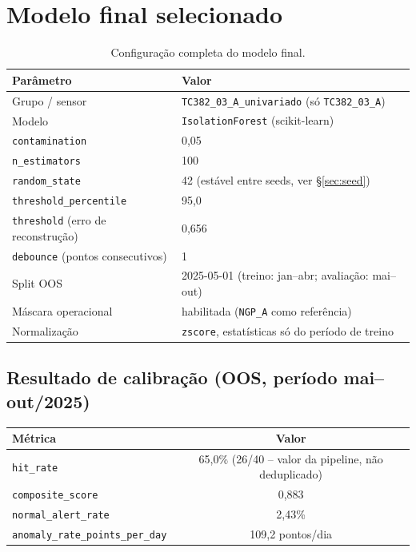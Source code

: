 \documentclass[11pt,a4paper]{article}
\begin{document}
\section{Modelo final selecionado}
\label{sec:modelo}

\begin{table}[H]
\centering
\begin{tabular}{@{}ll@{}}
\toprule
\textbf{Parâmetro} & \textbf{Valor} \\
\midrule
Grupo / sensor & \texttt{TC382\_03\_A\_univariado} (só \texttt{TC382\_03\_A}) \\
Modelo & \texttt{IsolationForest} (scikit-learn) \\
\texttt{contamination} & 0,05 \\
\texttt{n\_estimators} & 100 \\
\texttt{random\_state} & 42 (estável entre seeds, ver \S\ref{sec:seed}) \\
\texttt{threshold\_percentile} & 95,0 \\
\texttt{threshold} (erro de reconstrução) & 0,656 \\
\texttt{debounce} (pontos consecutivos) & 1 \\
Split OOS & 2025-05-01 (treino: jan--abr; avaliação: mai--out) \\
Máscara operacional & habilitada (\texttt{NGP\_A} como referência) \\
Normalização & \texttt{zscore}, estatísticas só do período de treino \\
\bottomrule
\end{tabular}
\caption{Configuração completa do modelo final.}
\end{table}

\subsection{Resultado de calibração (OOS, período mai--out/2025)}

\begin{table}[H]
\centering
\begin{tabular}{@{}lc@{}}
\toprule
\textbf{Métrica} & \textbf{Valor} \\
\midrule
\texttt{hit\_rate} & 65,0\% (26/40 -- valor da pipeline, não deduplicado) \\
\texttt{composite\_score} & 0,883 \\
\texttt{normal\_alert\_rate} & 2,43\% \\
\texttt{anomaly\_rate\_points\_per\_day} & 109,2 pontos/dia \\
\bottomrule
\end{tabular}
\end{table}
\end{document}
